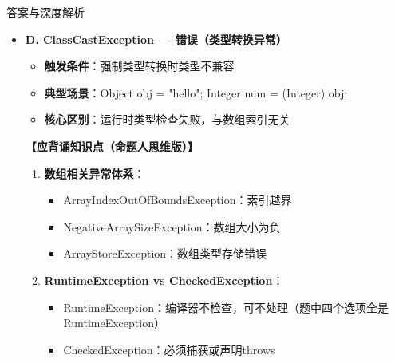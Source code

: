\documentclass[12pt, a4paper]{ctexart}
\begin{document}
\begin{enumerate}[label=\textbf{\arabic*.}]
\begin{bluebox}{答案与深度解析}
\begin{itemize}[label={}, leftmargin=*, nosep]
		      \item \textbf{D. ClassCastException — 错误（类型转换异常）}
		      \begin{itemize}[label={}, leftmargin=*, nosep]
			      \item \textbf{触发条件}：强制类型转换时类型不兼容
			      \item \textbf{典型场景}：Object obj = "hello"; Integer num = (Integer) obj;
			      \item \textbf{核心区别}：运行时类型检查失败，与数组索引无关
		      \end{itemize}

		      \textbf{【应背诵知识点（命题人思维版）】}
		      \begin{enumerate}[leftmargin=*, nosep, label={}]
			      \item \textbf{数组相关异常体系}：
			            \begin{itemize}[label={}, leftmargin=*, nosep]
				            \item ArrayIndexOutOfBoundsException：索引越界
				            \item NegativeArraySizeException：数组大小为负
				            \item ArrayStoreException：数组类型存储错误
			            \end{itemize}

			      \item \textbf{RuntimeException vs CheckedException}：
			            \begin{itemize}[label={}, leftmargin=*, nosep]
				            \item RuntimeException：编译器不检查，可不处理（题中四个选项全是RuntimeException）
				            \item CheckedException：必须捕获或声明throws
			            \end{itemize}


\end{enumerate}
\end{itemize}
\end{bluebox}
\end{enumerate}
\end{document}
